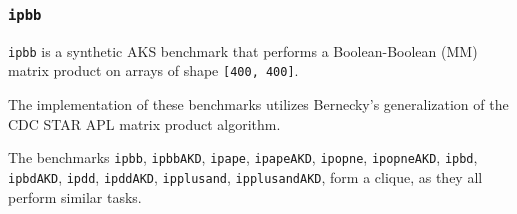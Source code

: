 \subsubsection{\tt ipbb}
\label{benchmarkipbb}

{\tt ipbb} is a synthetic AKS benchmark that performs
a Boolean-Boolean ({\apl M\qor\qdot\qand\qtran\0M}) matrix product on 
arrays of shape {\tt [400, 400]}.

The \sac implementation of these benchmarks utilizes Bernecky's
generalization of the CDC STAR APL matrix 
product algorithm.~\cite{RBernecky:apex}

The benchmarks {\tt ipbb}, {\tt ipbbAKD}, {\tt ipape}, {\tt ipapeAKD},
{\tt ipopne}, {\tt ipopneAKD}, {\tt ipbd}, {\tt ipbdAKD}, {\tt ipdd},
{\tt ipddAKD}, {\tt ipplusand}, {\tt ipplusandAKD},
form a clique, as they all perform similar tasks.
